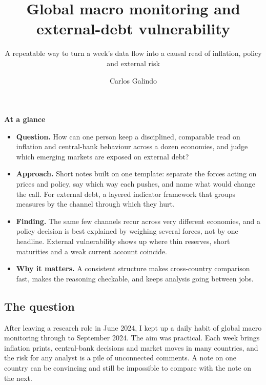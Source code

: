 \documentclass[
  british,
  a4paper,
]{article}
\title{Global macro monitoring and external-debt vulnerability}
\subtitle{A repeatable way to turn a week's data flow into a causal read
of inflation, policy and external risk}
\author{Carlos Galindo}
\date{}
\providecommand{\tightlist}{%
  \setlength{\itemsep}{0pt}\setlength{\parskip}{0pt}}
\begin{document}
\maketitle


\begin{tcolorbox}[enhanced jigsaw, arc=.35mm, bottomrule=.15mm, breakable, colback=white, colframe=quarto-callout-note-color-frame, left=2mm, leftrule=.75mm, opacityback=0, rightrule=.15mm, toprule=.15mm]

\vspace{-3mm}\textbf{At a glance}\vspace{3mm}

\begin{itemize}
\tightlist
\item
  \textbf{Question.} How can one person keep a disciplined, comparable
  read on inflation and central-bank behaviour across a dozen economies,
  and judge which emerging markets are exposed on external debt?
\item
  \textbf{Approach.} Short notes built on one template: separate the
  forces acting on prices and policy, say which way each pushes, and
  name what would change the call. For external debt, a layered
  indicator framework that groups measures by the channel through which
  they hurt.
\item
  \textbf{Finding.} The same few channels recur across very different
  economies, and a policy decision is best explained by weighing several
  forces, not by one headline. External vulnerability shows up where
  thin reserves, short maturities and a weak current account coincide.
\item
  \textbf{Why it matters.} A consistent structure makes cross-country
  comparison fast, makes the reasoning checkable, and keeps analysis
  going between jobs.
\end{itemize}

\end{tcolorbox}

\subsection{The question}\label{the-question}

After leaving a research role in June 2024, I kept up a daily habit of
global macro monitoring through to September 2024. The aim was
practical. Each week brings inflation prints, central-bank decisions and
market moves in many countries, and the risk for any analyst is a pile
of unconnected comments. A note on one country can be convincing and
still be impossible to compare with the note on the next.
\end{document}
